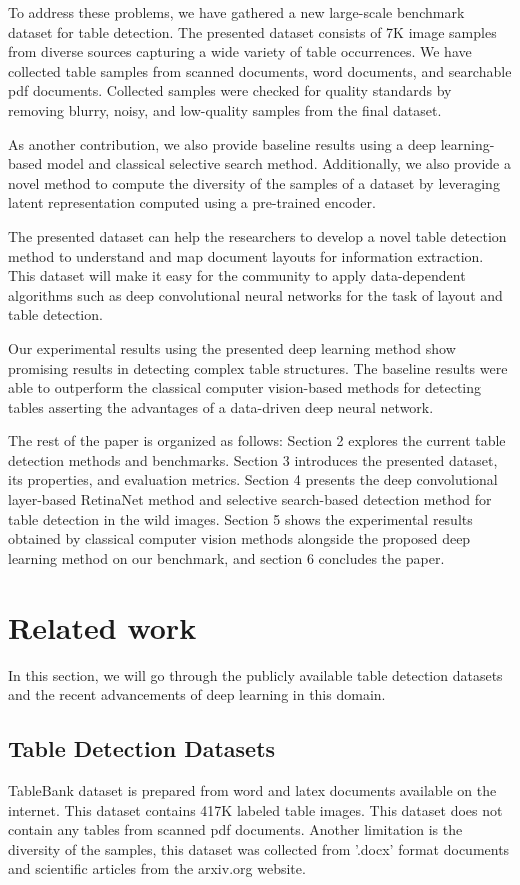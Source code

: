 \documentclass[a4paper,conference]{IEEEtran}
\begin{document}
To address these problems, we have gathered a new large-scale benchmark dataset for table detection. The presented dataset consists of 7K image samples from diverse sources capturing a wide variety of table occurrences. We have collected table samples from scanned documents, word documents, and searchable pdf documents. Collected samples were checked for quality standards by removing blurry, noisy, and low-quality samples from the final dataset. 

As another contribution, we also provide baseline results using a deep learning-based model and classical selective search method. Additionally, we also provide a novel method to compute the diversity of the samples of a dataset by leveraging latent representation computed using a pre-trained encoder.


The presented dataset can help the researchers to develop a novel table detection method to understand and map document layouts for information extraction. This dataset will make it easy for the community to apply data-dependent algorithms such as deep convolutional neural networks for the task of layout and table detection. 

Our experimental results using the presented deep learning method show promising results in detecting complex table structures. The baseline results were able to outperform the classical computer vision-based methods for detecting tables asserting the advantages of a data-driven deep neural network.  

The rest of the paper is organized as follows: Section 2 explores the current table detection methods and benchmarks. Section 3 introduces the presented dataset, its properties, and evaluation metrics. Section 4 presents the deep convolutional layer-based RetinaNet method and selective search-based detection method for table detection in the wild images. Section 5 shows the experimental results obtained by classical computer vision methods alongside the proposed deep learning method on our benchmark, and section 6 concludes the paper.  



\section{Related work}
In this section, we will go through the publicly available table detection datasets and the recent advancements of deep learning in this domain. 

\subsection{Table Detection Datasets}
TableBank \cite{tablebank} dataset is prepared from word and latex documents available on the internet. This dataset contains 417K labeled table images. This dataset does not contain any tables from scanned pdf documents. Another limitation is the diversity of the samples, this dataset was collected from '.docx' format documents and scientific articles from the arxiv.org website.
\end{document}
